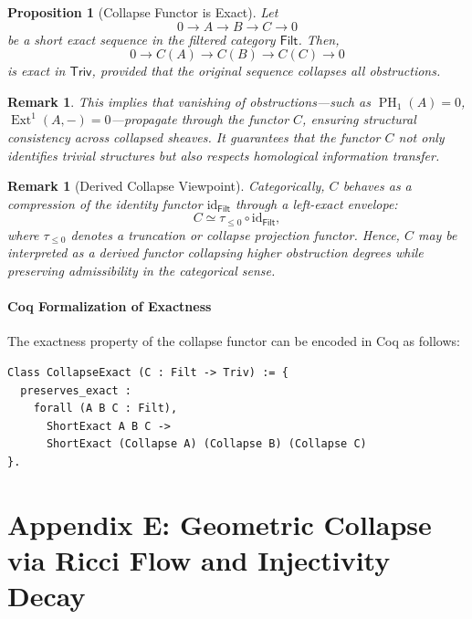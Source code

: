 \documentclass[11pt]{article}
\newtheorem{proposition}[theorem]{Proposition}
\newtheorem{remark}[theorem]{Remark}
\DeclareMathOperator{\Ext}{Ext}
\DeclareMathOperator{\PH}{PH}
\begin{document}
\begin{proposition}[Collapse Functor is Exact]
Let
\[
0 \longrightarrow A \longrightarrow B \longrightarrow C \longrightarrow 0
\]
be a short exact sequence in the filtered category \( \mathsf{Filt} \). Then,
\[
0 \longrightarrow C(A) \longrightarrow C(B) \longrightarrow C(C) \longrightarrow 0
\]
is exact in \( \mathsf{Triv} \), provided that the original sequence collapses all obstructions.
\end{proposition}

\begin{remark}
This implies that vanishing of obstructions---such as \( \PH_1(A) = 0 \), \( \Ext^1(A, -) = 0 \)---propagate through the functor \( C \), ensuring structural consistency across collapsed sheaves. It guarantees that the functor \( C \) not only identifies trivial structures but also respects homological information transfer.
\end{remark}

\begin{remark}[Derived Collapse Viewpoint]
Categorically, \( C \) behaves as a compression of the identity functor \( \mathrm{id}_{\mathsf{Filt}} \) through a left-exact envelope:
\[
C \simeq \tau_{\leq 0} \circ \mathrm{id}_{\mathsf{Filt}},
\]
where \( \tau_{\leq 0} \) denotes a truncation or collapse projection functor. Hence, \( C \) may be interpreted as a derived functor collapsing higher obstruction degrees while preserving admissibility in the categorical sense.
\end{remark}

\paragraph{Coq Formalization of Exactness}
The exactness property of the collapse functor can be encoded in Coq as follows:

\begin{lstlisting}[language=Coq]
Class CollapseExact (C : Filt -> Triv) := {
  preserves_exact :
    forall (A B C : Filt),
      ShortExact A B C ->
      ShortExact (Collapse A) (Collapse B) (Collapse C)
}.
\end{lstlisting}





\appendix
\section*{Appendix E: \texorpdfstring{Geometric Collapse via Ricci Flow and Injectivity Decay}{Geometric Collapse via Ricci Flow and Injectivity Decay}}
\end{document}
